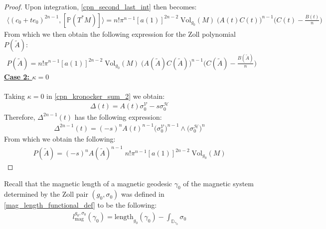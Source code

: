 \documentclass[11pt]{amsart}
\theoremstyle{plain}
\theoremstyle{definition}
\theoremstyle{remark}
\begin{document}
\begin{proof}
Upon integration, \eqref{cpn_second_last_int} then becomes:
\begin{align}\label{zoll_poly_computation_final_step}
  \langle (c_0+te_0)^{2n-1},[\mathbb{P}(T^*M)]\rangle = n!\pi^{n-1}[a(1)]^{2n-2}
    \;\text{Vol}_{g_0}(M)\; \big(A(t)C(t)\big)^{n-1}\bigg(C(t) -\frac{B(t)}{n} \bigg) 
\end{align}
From which we then obtain the following expression for the Zoll polynomial $P(\tilde A)$:
\begin{align}
    P(\tilde A)= n!\pi^{n-1}[a(1)]^{2n-2}
    \;\text{Vol}_{g_0}(M)\; \big(A(\tilde A)C(\tilde A)\big)^{n-1}\bigg(C(\tilde A) -\frac{B(\tilde A)}{n} \bigg) 
\end{align}
\textbf{\underline{Case 2: $\kappa =0$}}\\
\\
Taking $\kappa =0$ in \eqref{cpn_kronocker_sum_2} we obtain:
\begin{align}
    \Delta(t) =  A(t)\sigma^{\mathcal{V}}_{0} -s \sigma^{\mathcal{H}}_0
\end{align}
Therefore, $\Delta^{2n-1}(t)$ has the following expression:
\begin{align}
    \Delta^{2n-1}(t) = (-s)^n A(t)^{n-1}\big(\sigma^{\mathcal{V}}_{0}\big)^{n-1} \wedge \big(\sigma^{\mathcal{H}}_{0}\big)^{n}
\end{align}
From which we obtain the following: 
\begin{align}
    P(\tilde A)
 =  (-s)^n A(\tilde A)^{n-1}\; n!\pi^{n-1}[a(1)]^{2n-2}
    \;\text{Vol}_{g_0}(M)
\end{align}
\end{proof}
Recall that the magnetic length of a magnetic geodesic $\gamma_0$ of the magnetic system determined by the Zoll pair $(g_0,\sigma_0)$ was defined in \eqref{mag_length_functional_def} to be the following:
\begin{align}\label{mag_length_kahler_def_Zoll}
    l^{g_0,\sigma_0}_{\text{mag}}(\gamma_{0}) = \text{length}_{g_0}(\gamma_{0}) - \int_{\mathbb{D}_{\gamma_{0}} } \sigma_{0} 
\end{align}
\end{document}
